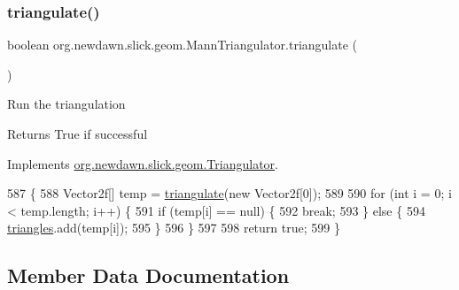 \subsubsection{\texorpdfstring{triangulate()}{triangulate()}\hspace{0.1cm}{\footnotesize\ttfamily [2/2]}}
{\footnotesize\ttfamily boolean org.\+newdawn.\+slick.\+geom.\+Mann\+Triangulator.\+triangulate (\begin{DoxyParamCaption}{ }\end{DoxyParamCaption})\hspace{0.3cm}{\ttfamily [inline]}}

Run the triangulation

\begin{DoxyReturn}{Returns}
True if successful 
\end{DoxyReturn}


Implements \mbox{\hyperlink{interfaceorg_1_1newdawn_1_1slick_1_1geom_1_1_triangulator_a7c7ce8f59679b6c759a1e3d15ec4ee92}{org.\+newdawn.\+slick.\+geom.\+Triangulator}}.


\begin{DoxyCode}
587                                  \{
588         Vector2f[] temp = \mbox{\hyperlink{classorg_1_1newdawn_1_1slick_1_1geom_1_1_mann_triangulator_a14301dcfbddc186d4e24dba24dba2535}{triangulate}}(\textcolor{keyword}{new} Vector2f[0]);
589 
590         \textcolor{keywordflow}{for} (\textcolor{keywordtype}{int} i = 0; i < temp.length; i++) \{
591             \textcolor{keywordflow}{if} (temp[i] == null) \{
592                 \textcolor{keywordflow}{break};
593             \} \textcolor{keywordflow}{else} \{
594                 \mbox{\hyperlink{classorg_1_1newdawn_1_1slick_1_1geom_1_1_mann_triangulator_ad0c6e5e26a0a15154513f0225f156c7a}{triangles}}.add(temp[i]);
595             \}
596         \}
597 
598         \textcolor{keywordflow}{return} \textcolor{keyword}{true};
599     \}
\end{DoxyCode}


\subsection{Member Data Documentation}
\mbox{\label{classorg_1_1newdawn_1_1slick_1_1geom_1_1_mann_triangulator_a94eff0c5ad39ce0c232815591fe3f2d8}} 
